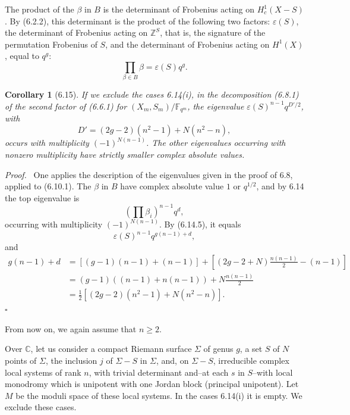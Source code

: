 \documentclass[10pt]{article}
\newcommand{\Fb}{\mathbb F}
\newcommand{\C}{\mathbb C}
\newcommand{\Z}{\mathbb Z}
\theoremstyle{deligne}
\newtheorem*{corollary*}{Corollary}
\newenvironment{proofdel}[1][Proof.]{\textit{#1}\ }{\hfill$\square$}
\newcommand{\heading}[1]{\vspace{0.7em}\noindent{\bfseries #1}\quad}
\begin{document}
The product of the $\beta$ in $B$ is the determinant of Frobenius acting on $H^1_c(X-S)$. By (6.2.2), this determinant is the product of the following two factors: $\varepsilon(S)$, the determinant of Frobenius acting on $\Z^S$, that is, the signature of the permutation Frobenius of $S$, and the determinant of Frobenius acting on $H^1(X)$, equal to $q^g$:
\begin{equation}\tag{6.14.5}
\prod_{\beta\in B}\beta=\varepsilon(S)q^g.
\end{equation}

\begin{corollary*}[6.15]
If we exclude the cases 6.14(i), in the decomposition (6.8.1) of the second factor of (6.6.1) for $(X_m,S_m)/\Fb_{q^m}$, the eigenvalue $\varepsilon(S)^{n-1}q^{D'/2}$, with
\[
D'=(2g-2)(n^2-1)+N(n^2-n),
\]
occurs with multiplicity $(-1)^{N(n-1)}$. The other eigenvalues occurring with nonzero multiplicity have strictly smaller complex absolute values.
\end{corollary*}
\begin{proofdel}
One applies the description of the eigenvalues given in the proof of 6.8, applied to (6.10.1). The $\beta$ in $B$ have complex absolute value $1$ or $q^{1/2}$, and by 6.14 the top eigenvalue is
\[
\left(\prod\beta_i\right)^{n-1}q^d,
\]
occurring with multiplicity $(-1)^{N(n-1)}$. By (6.14.5), it equals
\[
\varepsilon(S)^{n-1}q^{g(n-1)+d},
\]
and
\begin{align*}
g(n-1)+d&=[(g-1)(n-1)+(n-1)]+\left[(2g-2+N)\frac{n(n-1)}2-(n-1)\right]\\
&=(g-1)((n-1)+n(n-1))+N\frac{n(n-1)}2\\
&=\frac12[(2g-2)(n^2-1)+N(n^2-n)].
\end{align*}
\end{proofdel}

From now on, we again assume that $n\ge2$.

\heading{6.16.} Over $\C$, let us consider a compact Riemann surface $\Sigma$ of genus $g$, a set $S$ of $N$ points of $\Sigma$, the inclusion $j$ of $\Sigma-S$ in $\Sigma$, and, on $\Sigma-S$, irreducible complex local systems of rank $n$, with trivial determinant and--at each $s$ in $S$--with local monodromy which is unipotent with one Jordan block (principal unipotent). Let $M$ be the moduli space of these local systems. In the cases 6.14(i) it is empty. We exclude these cases.
\end{document}
